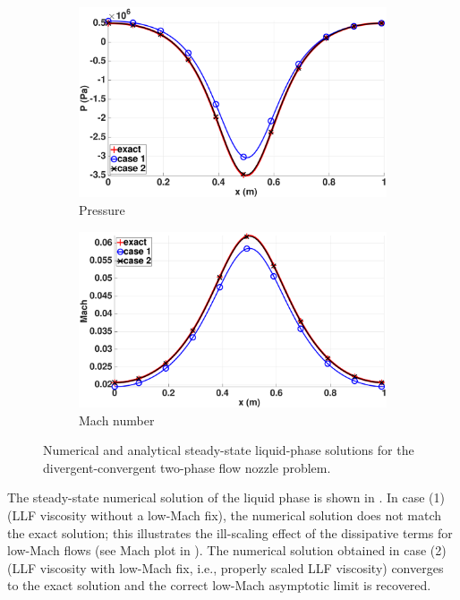 \begin{figure}[H]
        \begin{subfigure}[b]{0.495\textwidth}
                \centering
                \includegraphics[width=\textwidth]{figures/liquid_pressure_llf_and_exact_100.eps}
                \caption{Pressure}
                \label{fig:liq-phase-press}
        \end{subfigure}        
        \begin{subfigure}[b]{0.495\textwidth}
                \centering
                \includegraphics[width=\textwidth]{figures/liquid_mach_llf_and_exact_100.eps}
                \caption{Mach number}
                \label{fig:liq-phase-mach}
        \end{subfigure}
        \caption{Numerical and analytical steady-state liquid-phase solutions for the divergent-convergent two-phase flow nozzle problem.}\label{fig:liq-phase}
\end{figure}
%
The steady-state numerical solution of the liquid phase is shown in .
In case (1) (LLF viscosity without a low-Mach fix), the numerical solution does not match the exact solution; this illustrates the ill-scaling effect of the 
dissipative terms for low-Mach flows (see Mach plot in  ). The numerical solution obtained in case (2) (LLF viscosity with low-Mach fix,
i.e., properly scaled LLF viscosity) converges to the exact solution and the correct low-Mach asymptotic limit is recovered. 
%
